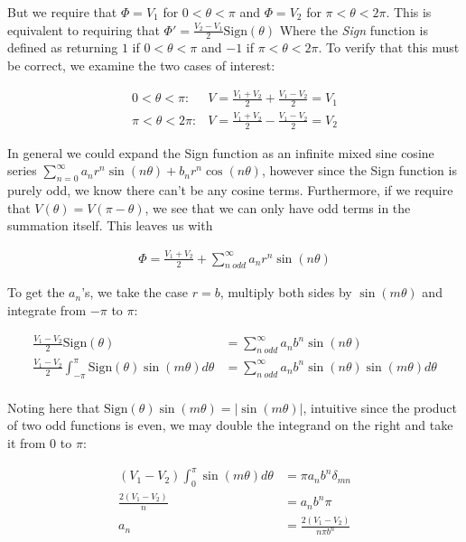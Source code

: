 \documentclass[paper=a4, fontsize=11pt]{scrartcl} %
\numberwithin{equation}{section} %
\numberwithin{figure}{section} %
\numberwithin{table}{section} %
\begin{document}
But we require that $\Phi = V_1$ for $0 < \theta < \pi$ and $\Phi = V_2$ for $\pi < \theta < 2 \pi$. This is equivalent to requiring that $\Phi' = \frac{V_2 - V_1}{2}\text{Sign}(\theta)$ Where the \textit{Sign} function is defined as returning $1$ if $ 0 < \theta < \pi$ and $-1$ if $\pi < \theta < 2 \pi$. To verify that this must be correct, we examine the two cases of interest:

\begin{align}
0 < \theta < \pi: & V = \frac{V_1 + V_2}{2} + \frac{V_1 - V_2}{2} = V_1 \\
\pi < \theta < 2\pi: & V = \frac{V_1 + V_2}{2} - \frac{V_1 - V_2}{2} = V_2 
\end{align}

In general we could expand the Sign function as an infinite mixed sine cosine series $\sum_{n=0}^{\infty} a_n r^n \sin(n \theta) + b_n r^n \cos(n \theta)$, however since the Sign function is purely odd, we know there can't be any cosine terms. Furthermore, if we require that $V(\theta) = V(\pi - \theta)$, we see that we can only have odd terms in the summation itself. This leaves us with

\begin{align}
\Phi = \frac{V_1 + V_2}{2} + \sum_{n \ odd}^{\infty}a_n r^n \sin(n \theta)
\end{align} 

To get the $a_n$'s, we take the case $r = b$, multiply both sides by $\sin(m \theta)$ and integrate from $-\pi$ to $\pi$:

\begin{align}
\frac{V_1 - V_2}{2}\text{Sign}(\theta) &= \sum_{n \ odd}^{\infty}a_n b^n \sin(n \theta) \\
\frac{V_1 - V_2}{2}\int_{-\pi}^{\pi} \text{Sign}(\theta)\sin(m \theta)d\theta &= \sum_{n \ odd}^{\infty}a_n b^n \sin(n \theta)\sin(m \theta)d\theta \\
\end{align}

Noting here that $\text{Sign}(\theta) \sin(m \theta) = |\sin(m \theta)|$, intuitive since the product of two odd functions is even, we may double the integrand on the right and take it from $0$ to $\pi$:

\begin{align}
(V_1 - V_2) \int_0^{\pi}\sin(m \theta)d\theta &= \pi a_n b^n \delta_{mn} \\
\frac{2(V_1 - V_2)}{n} &= a_n b^n \pi \\
a_n &= \frac{2(V_1 - V_2)}{n \pi b^n} \\
\end{align}
\end{document}
